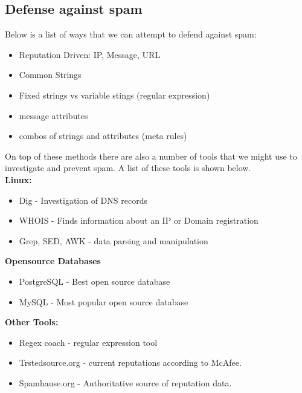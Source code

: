 \documentclass[letterpaper, onecolumn,10pt]{IEEEtran}
\begin{document}
		    \subsection{Defense against spam}
		    Below is a list of ways that we can attempt to defend against spam:
		    \begin{itemize}
		        \item Reputation Driven: IP, Message, URL
		        \item Common Strings
		        \item Fixed strings vs variable stings (regular expression)
		        \item message attributes
		        \item combos of strings and attributes (meta rules)
		    \end{itemize}
		    On top of these methods there are also a number of tools that we might use to investigate and prevent spam. A list of these tools is shown below.\\
		    
		    \textbf{Linux:}
		    \begin{itemize}
		        \item Dig - Investigation of DNS records
		        \item WHOIS - Finds information about an IP or Domain registration
		        \item Grep, SED, AWK - data parsing and manipulation
		    \end{itemize}
		    
		    \textbf{Opensource Databases}
		    \begin{itemize}
		        \item PostgreSQL - Best open source database
		        \item MySQL - Most popular open source database
		    \end{itemize}
		    
		    \textbf{Other Tools:}
		    \begin{itemize}
		        \item Regex coach - regular expression tool
		        \item Trstedsource.org - current reputations according to McAfee.
		        \item Spamhause.org - Authoritative source of reputation data.
		    \end{itemize}
		    
\end{document}
